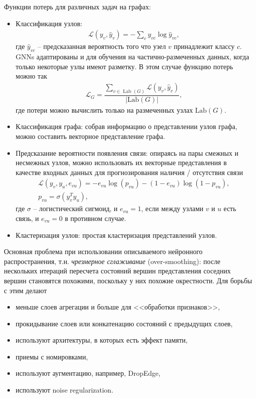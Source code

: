 \documentclass[%
	11pt,
	a4paper,
	utf8,
		]{article}
\begin{document}
Функции потерь для различных задач на графах:
\begin{itemize}
	\item Классификация узлов:
\begin{align*}
	\mathcal{L}(y_v, \hat{y}_v) = - \sum_c y_{vc} \log \hat{y}_{vc},
\end{align*}
где $ \hat{y}_{vc} $ -- предсказанная вероятность того что узел $ v $ принадлежит классу $ c $. GNNs адаптированы и для обучения на частично-размеченных данных, когда только некоторые узлы имеют разметку. В этом случае функцию потерь можно так
\begin{align*}
	\mathcal{L}_G = \dfrac{ \sum\limits_{ v \in \text{ Lab }(G) } \mathcal{L}(y_v, \hat{y}_v)}{ | \text{Lab}(G) | },
\end{align*}
где потери можно вычислить только на размеченных узлах $ \text{Lab}(G) $.

    \item Классификация графа: собрав информацию о представлении узлов графа, можно составить векторное представление графа. 
    
    \item Предсказание вероятности появления связи: опираясь на пары смежных и несмежных узлов, можно использовать их векторные представления в качестве входных данных для прогнозирования наличия / отсутствия связи
\begin{align*}
	\mathcal{L}(y_v, y_u, e_{vu}) = - e_{vu} \log (p_{vu}) - (1 - e_{vu}) \log(1 - p_{vu}),\\
	p_{vu} = \sigma (y_v^T y_u),
\end{align*}
где $ \sigma $ -- логистический сигмоид, и $ e_{vu} = 1 $, если между узлами $ v $ и $ u $ есть связь, и $ e_{vu} = 0 $ в противном случае.

    \item Кластеризация узлов: простая кластеризация представлений узлов.
\end{itemize}

Основная проблема при использовании описываемого нейронного распространения, т.н. \emph{чрезмерное сглаживание} (over-smoothing): после нескольких итераций пересчета состояний вершин представления соседних вершин становятся похожими, поскольку у них похожие окрестности. Для борьбы с этим делают
\begin{itemize}
	\item меньше слоев агрегации и больше для <<обработки признаков>>,
	
	\item прокидывание слоев или конкатенацию состояний с предыдущих слоев,
	
	\item используют архитектуры, в которых есть эффект памяти,
	
	\item приемы с номировками,
	
	\item используют аугментацию, например, DropEdge,
	
	\item используют noise regularization.
\end{itemize}
\end{document}
